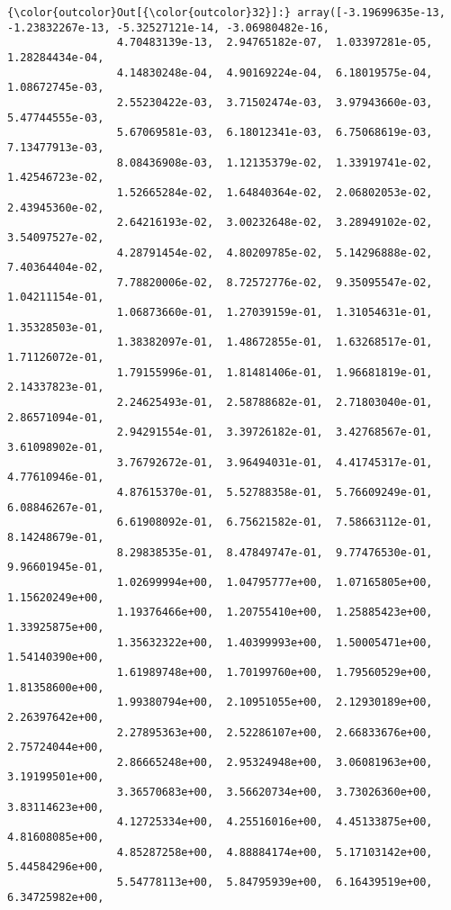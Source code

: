 \documentclass[11pt]{article}
\begin{document}
\begin{Verbatim}[commandchars=\\\{\}]
{\color{outcolor}Out[{\color{outcolor}32}]:} array([-3.19699635e-13, -1.23832267e-13, -5.32527121e-14, -3.06980482e-16,
                 4.70483139e-13,  2.94765182e-07,  1.03397281e-05,  1.28284434e-04,
                 4.14830248e-04,  4.90169224e-04,  6.18019575e-04,  1.08672745e-03,
                 2.55230422e-03,  3.71502474e-03,  3.97943660e-03,  5.47744555e-03,
                 5.67069581e-03,  6.18012341e-03,  6.75068619e-03,  7.13477913e-03,
                 8.08436908e-03,  1.12135379e-02,  1.33919741e-02,  1.42546723e-02,
                 1.52665284e-02,  1.64840364e-02,  2.06802053e-02,  2.43945360e-02,
                 2.64216193e-02,  3.00232648e-02,  3.28949102e-02,  3.54097527e-02,
                 4.28791454e-02,  4.80209785e-02,  5.14296888e-02,  7.40364404e-02,
                 7.78820006e-02,  8.72572776e-02,  9.35095547e-02,  1.04211154e-01,
                 1.06873660e-01,  1.27039159e-01,  1.31054631e-01,  1.35328503e-01,
                 1.38382097e-01,  1.48672855e-01,  1.63268517e-01,  1.71126072e-01,
                 1.79155996e-01,  1.81481406e-01,  1.96681819e-01,  2.14337823e-01,
                 2.24625493e-01,  2.58788682e-01,  2.71803040e-01,  2.86571094e-01,
                 2.94291554e-01,  3.39726182e-01,  3.42768567e-01,  3.61098902e-01,
                 3.76792672e-01,  3.96494031e-01,  4.41745317e-01,  4.77610946e-01,
                 4.87615370e-01,  5.52788358e-01,  5.76609249e-01,  6.08846267e-01,
                 6.61908092e-01,  6.75621582e-01,  7.58663112e-01,  8.14248679e-01,
                 8.29838535e-01,  8.47849747e-01,  9.77476530e-01,  9.96601945e-01,
                 1.02699994e+00,  1.04795777e+00,  1.07165805e+00,  1.15620249e+00,
                 1.19376466e+00,  1.20755410e+00,  1.25885423e+00,  1.33925875e+00,
                 1.35632322e+00,  1.40399993e+00,  1.50005471e+00,  1.54140390e+00,
                 1.61989748e+00,  1.70199760e+00,  1.79560529e+00,  1.81358600e+00,
                 1.99380794e+00,  2.10951055e+00,  2.12930189e+00,  2.26397642e+00,
                 2.27895363e+00,  2.52286107e+00,  2.66833676e+00,  2.75724044e+00,
                 2.86665248e+00,  2.95324948e+00,  3.06081963e+00,  3.19199501e+00,
                 3.36570683e+00,  3.56620734e+00,  3.73026360e+00,  3.83114623e+00,
                 4.12725334e+00,  4.25516016e+00,  4.45133875e+00,  4.81608085e+00,
                 4.85287258e+00,  4.88884174e+00,  5.17103142e+00,  5.44584296e+00,
                 5.54778113e+00,  5.84795939e+00,  6.16439519e+00,  6.34725982e+00,

\end{Verbatim}
\end{document}
